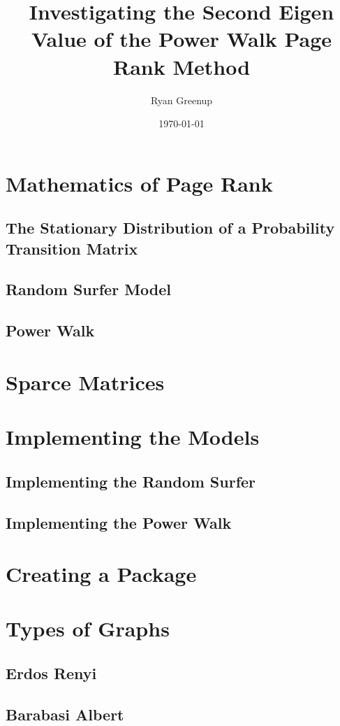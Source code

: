 \documentclass[11pt]{article}
\author{Ryan Greenup}
\date{\today}
\title{Investigating the Second Eigen Value of the Power Walk Page Rank Method}
\begin{document}
\maketitle
\tableofcontents



\section{Mathematics of Page Rank}
\label{sec:orgfa77c63}
\subsection{The Stationary Distribution of a Probability Transition Matrix}
\label{sec:org41d0cfd}
\subsection{Random Surfer Model}
\label{sec:orgc464802}
\subsection{Power Walk}
\label{sec:orgf0ab29b}
\section{Sparce Matrices}
\label{sec:org4e3bf71}
\section{Implementing the Models}
\label{sec:orgfe46092}
\subsection{Implementing the Random Surfer}
\label{sec:orgce4d33e}
\subsection{Implementing the Power Walk}
\label{sec:org7ffea81}
\section{Creating a Package}
\label{sec:orgc1967ad}
\section{Types of Graphs}
\label{sec:org8daad92}
\subsection{Erdos Renyi}
\label{sec:orgb7ab4be}
\subsection{Barabasi Albert}
\label{sec:orge5f000b}
\end{document}
